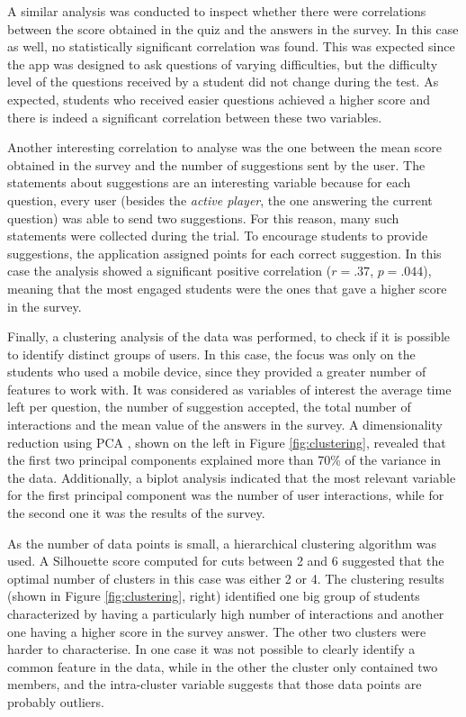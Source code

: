 A similar analysis was conducted to inspect whether there were correlations between the score obtained in the quiz and the answers in the survey. In this case as well, no statistically significant correlation was found.
This was  expected since the app was designed to ask questions of varying difficulties, but the difficulty level of the questions received by a student did not change during the test.
As expected, students who received easier questions achieved a higher score and there is indeed a significant correlation between these two variables.

Another interesting correlation to analyse was the one between the mean score obtained in the survey and the number of suggestions sent by the user.
The statements about suggestions are an interesting variable because for each question, every user (besides the \textit{active player}, the one answering the current question) was able to send two suggestions.
For this reason, many such statements were collected during the trial.
To encourage students to provide suggestions, the application assigned points for each correct suggestion.
In this case the analysis showed a significant positive correlation ($r = .37$, $p = .044$), meaning that the most engaged students were the ones that gave a higher score in the survey.

Finally, a clustering analysis of the data was performed, to check if it is possible to identify distinct groups of users.
In this case, the focus was only on the students who used a mobile device, since they provided a greater number of features to work with.
It was considered as variables of interest the average time left per question, the number of suggestion accepted, the total number of interactions and the mean value of the answers in the survey.
A dimensionality reduction using PCA \citep{jolliffe2002principal}, shown on the left in Figure \ref{fig:clustering}, revealed that the first two principal components explained more than 70\% of the variance in the data.
Additionally, a biplot analysis indicated that the most relevant variable for the first principal component was the number of user interactions, while for the second one it was the results of the survey.

As the number of data points is small, a hierarchical clustering algorithm \citep{hiera} was used.
A Silhouette score \citep{ROUSSEEUW198753} computed for cuts between 2 and 6 suggested that the optimal number of clusters in this case was either 2 or 4.
The clustering results (shown in Figure \ref{fig:clustering}, right) identified one big group of students characterized by having a particularly high number of interactions and another one having a higher score in the survey answer.
The other two clusters were harder to characterise.
In one case it was not possible to clearly identify a common feature in the data, while in the other the cluster only contained two members, and the intra-cluster variable suggests that those data points are probably outliers.

